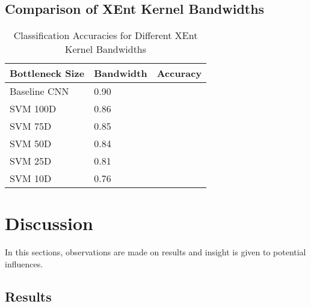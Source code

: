 \documentclass[conference]{IEEEtran}
\begin{document}
\subsection{Comparison of XEnt Kernel Bandwidths}

\begin{table}[h!]
	\caption{Classification Accuracies for Different XEnt Kernel Bandwidths}
	\label{tab:bw_comparison}
	\normalsize
	\begin{tabularx}{\columnwidth}{ |X|X|X| } 
		\hline
		\centering \textbf{Bottleneck Size}  & \textbf{Bandwidth} & \textbf{Accuracy} \\
		\hline
		\centering Baseline CNN & 0.90 \\
		\hline
		\centering SVM 100D & 0.86 \\
		\hline
		\centering SVM 75D & 0.85 \\
		\hline
		\centering SVM 50D & 0.84 \\
		\hline
		\centering SVM 25D & 0.81 \\
		\hline
		\centering SVM 10D & 0.76 \\
		\hline
	\end{tabularx}
\end{table} 

\vspace{5cm}
\section{Discussion} \label{Discussion}
In this sections, observations are made on results and insight is given to potential influences.








\subsection{Results}
\end{document}
